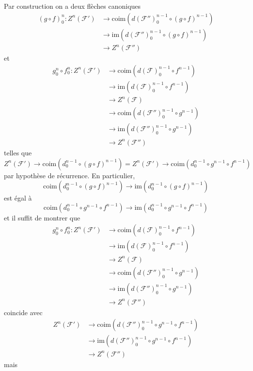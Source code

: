 \documentclass[a4paper,12pt]{article}
\newcommand{\F}{\mathscr F}
\newcommand{\im}{\textrm{im}}
\newcommand{\coim}{\textrm{coim}}
\theoremstyle{plain}
\theoremstyle{definition}
\theoremstyle{remark}
\begin{document}
Par construction on a deux flèches canoniques 
\begin{align*}
(g\circ f)_0^n\colon Z^n(\F')&\to \coim(d(\F'')_0^{n-1}\circ (g\circ f)^{n-1})\\
			     &\to\im(d(\F'')_0^{n-1}\circ (g\circ f)^{n-1}) \\
			     &\to Z^n(\F'')
\end{align*}
et 
\begin{align*}
g_0^n\circ f_0^n\colon Z^n(\F')&\to \coim(d(\F)_0^{n-1}\circ f^{n-1}) \\
			       &\to \im(d(\F)_0^{n-1}\circ f^{n-1}) \\
			       &\to Z^n(\F)\\
			       &\to \coim(d(\F'')_0^{n-1}\circ g^{n-1}) \\
			       &\to\im(d(\F'')_0^{n-1}\circ g^{n-1})\\
			       &\to Z^n(\F'')
\end{align*}
telles que \[Z^n(\F')\to \coim(d_0^{n-1}\circ (g\circ f)^{n-1})=
Z^n(\F')\to \coim(d_0^{n-1}\circ g^{n-1}\circ f^{n-1})\]
par hypothèse de récurrence. En particulier, 
\[\coim(d_0^{n-1}\circ (g\circ f)^{n-1})\to \im(d_0^{n-1}\circ (g\circ f)^{n-1})\]
est égal à 
\[\coim(d_0^{n-1}\circ g^{n-1}\circ f^{n-1})\to \im(d_0^{n-1}\circ g^{n-1}\circ f^{n-1})\]
et il suffit de montrer que 
\begin{align*}
g_0^n\circ f_0^n\colon Z^n(\F')&\to \coim(d(\F)_0^{n-1}\circ f^{n-1}) \\
			       &\to \im(d(\F)_0^{n-1}\circ f^{n-1}) \\
			       &\to Z^n(\F)\\
			       &\to \coim(d(\F'')_0^{n-1}\circ g^{n-1}) \\
			       &\to\im(d(\F'')_0^{n-1}\circ g^{n-1})\\
			       &\to Z^n(\F'')
\end{align*}
coincide avec 
\begin{align*}
	Z^n(\F')&\to \coim(d(\F'')_0^{n-1}\circ g^{n-1}\circ f^{n-1})\\
		&\to\im(d(\F'')_0^{n-1}\circ g^{n-1}\circ f^{n-1})\\
			     &\to Z^n(\F'')
\end{align*}
mais 
\end{document}
